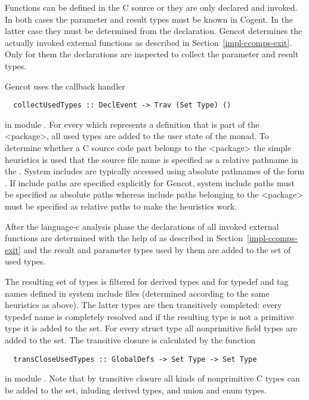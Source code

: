 Functions can be defined in the C source or they are only declared and invoked. In both cases the parameter and result
types must be known in Cogent. In the latter case they must be determined from the declaration. Gencot determines the
actually invoked external functions as described in Section~\ref{impl-ccomps-exit}. Only for them the declarations 
are inspected to collect the parameter and result types.

Gencot uses the callback handler
\begin{verbatim}
  collectUsedTypes :: DeclEvent -> Trav (Set Type) ()
\end{verbatim}
in module . For every  which represents a definition that is
part of the <package>, all used types are added to the user state of the  monad. To determine whether
a C source code part belongs to the <package> the simple heuristics is used that the source file name is specified
as a relative pathname in the . System includes are typically accessed using absolute pathnames of the 
form . If include paths are specified explicitly for Gencot, system include paths must be 
specified as absolute paths whereas include paths belonging to the <package> must be specified as relative paths
to make the heuristics work.

After the language-c analysis phase the declarations of all invoked external functions are determined with the
help of  as described in Section~\ref{impl-ccomps-exit} and the result and parameter 
types used by them are added to the set of used types.

The resulting set of types is filtered for derived types and for typedef and tag names defined in system include files
(determined according to the same heuristics as above). The latter types are then transitively completed: every typedef 
name is completely resolved and if the resulting type is not a primitive type it is added to the set. For every struct
type all nonprimitive field types are added to the set. The transitive closure is calculated by the function
\begin{verbatim}
  transCloseUsedTypes :: GlobalDefs -> Set Type -> Set Type
\end{verbatim}
in module . Note that by transitive closure all kinds of nonprimitive C types can be added to
the set, inluding derived types, and union and enum types.

